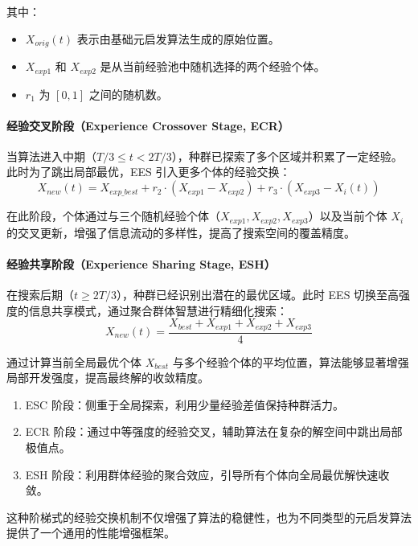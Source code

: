 \documentclass{wzuthesis}
\begin{document}
其中：
\begin{itemize}
\item $X_{orig}(t)$ 表示由基础元启发算法生成的原始位置。
\item $X_{exp1}$ 和 $X_{exp2}$ 是从当前经验池中随机选择的两个经验个体。
\item $r_1$ 为 $[0, 1]$ 之间的随机数。
\end{itemize}

\paragraph{经验交叉阶段（Experience Crossover Stage, ECR）}
当算法进入中期（$T/3 \le t < 2T/3$），种群已探索了多个区域并积累了一定经验。此时为了跳出局部最优，EES 引入更多个体的经验交换：
\begin{equation}
X_{new}(t) = X_{exp\_best} + r_2 \cdot (X_{exp1} - X_{exp2}) + r_3 \cdot (X_{exp3} - X_{i}(t))
\end{equation}

在此阶段，个体通过与三个随机经验个体（$X_{exp1}, X_{exp2}, X_{exp3}$）以及当前个体 $X_i$ 的交叉更新，增强了信息流动的多样性，提高了搜索空间的覆盖精度。

\paragraph{经验共享阶段（Experience Sharing Stage, ESH）}
在搜索后期（$t \ge 2T/3$），种群已经识别出潜在的最优区域。此时 EES 切换至高强度的信息共享模式，通过聚合群体智慧进行精细化搜索：
\begin{equation}
X_{new}(t) = \frac{X_{best} + X_{exp1} + X_{exp2} + X_{exp3}}{4}
\end{equation}

通过计算当前全局最优个体 $X_{best}$ 与多个经验个体的平均位置，算法能够显著增强局部开发强度，提高最终解的收敛精度。

\begin{enumerate}
\item[（1）] ESC 阶段：侧重于全局探索，利用少量经验差值保持种群活力。
\item[（2）] ECR 阶段：通过中等强度的经验交叉，辅助算法在复杂的解空间中跳出局部极值点。
\item[（3）] ESH 阶段：利用群体经验的聚合效应，引导所有个体向全局最优解快速收敛。
\end{enumerate}
这种阶梯式的经验交换机制不仅增强了算法的稳健性，也为不同类型的元启发算法提供了一个通用的性能增强框架。
\end{document}

